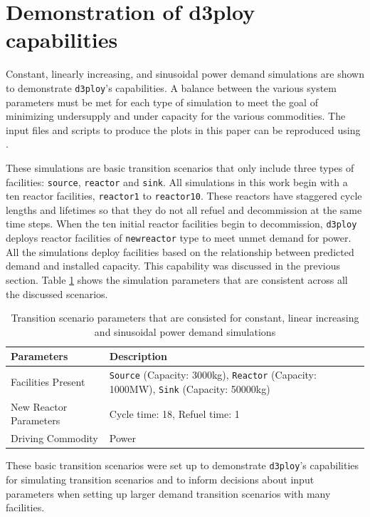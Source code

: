 \documentclass[11pt,letterpaper]{article}
\newcommand{\deploy}{\texttt{d3ploy}\xspace}%
\begin{document}
\section{Demonstration of d3ploy capabilities}
Constant, linearly increasing, and sinusoidal power demand simulations
are shown to demonstrate \deploy's capabilities. 
A balance between the various system parameters must be 
met for each type of simulation to meet the goal of 
minimizing undersupply and under capacity for the various 
commodities. 
The input files and scripts to produce the plots in this paper 
can be reproduced using \cite{d3ploy_doi_2019}.

These simulations are basic transition scenarios that only include
three types of facilities: \texttt{source}, \texttt{reactor} and 
\texttt{sink}.
All simulations in this work begin with a ten reactor facilities, 
\texttt{reactor1} to \texttt{reactor10}. 
These reactors have staggered cycle lengths and lifetimes 
so that they do not all refuel and decommission at the same time 
steps. 
When the ten initial reactor facilities begin to decommission, 
\deploy deploys reactor facilities of \texttt{newreactor} type
to meet unmet demand for power. 
All the simulations deploy facilities based on the relationship
between predicted demand and installed capacity. 
This capability was discussed in the previous section.  
Table \ref{tab:transition-scenario-all} shows the simulation 
parameters that are consistent across all the discussed 
scenarios. 

\begin{table}[!htb]
    \centering
    \caption {Transition scenario parameters that are consisted for constant, linear increasing and sinusoidal power demand simulations}
	\label{tab:transition-scenario-all}
    \begin{tabular}{|l|p{5.2cm}|}
    \hline
    \textbf{Parameters}    & \textbf{Description} \\ \hline
    Facilities Present     & \texttt{Source} (Capacity: 3000kg), \texttt{Reactor} (Capacity: 1000MW), \texttt{Sink} (Capacity: 50000kg)      \\ \hline
    New Reactor Parameters & Cycle time: 18, Refuel time: 1\\ \hline
    Driving Commodity & Power \\ \hline
    \end{tabular}
\end{table}

These basic transition scenarios were set up to 
demonstrate \deploy's capabilities for simulating 
transition scenarios and 
to inform decisions about input parameters when setting up larger 
demand transition scenarios with many facilities. 
\end{document}
